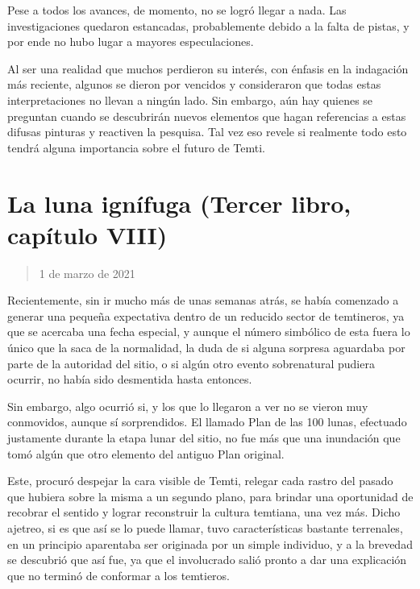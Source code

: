 \documentclass[
]{book}
\begin{document}
Pese a todos los avances, de momento, no se logró llegar a nada. Las investigaciones quedaron estancadas, probablemente debido a la falta de pistas, y por ende no hubo lugar a mayores especulaciones.

Al ser una realidad que muchos perdieron su interés, con énfasis en la indagación más reciente, algunos se dieron por vencidos y consideraron que todas estas interpretaciones no llevan a ningún lado. Sin embargo, aún hay quienes se preguntan cuando se descubrirán nuevos elementos que hagan referencias a estas difusas pinturas y reactiven la pesquisa. Tal vez eso revele si realmente todo esto tendrá alguna importancia sobre el futuro de Temti.

\hypertarget{la-luna-ignuxedfuga-tercer-libro-capuxedtulo-viii}{%
\section{La luna ignífuga (Tercer libro, capítulo VIII)}\label{la-luna-ignuxedfuga-tercer-libro-capuxedtulo-viii}}

\begin{quote}
1 de marzo de 2021
\end{quote}

Recientemente, sin ir mucho más de unas semanas atrás, se había comenzado a generar una pequeña expectativa dentro de un reducido sector de temtineros, ya que se acercaba una fecha especial, y aunque el número simbólico de esta fuera lo único que la saca de la normalidad, la duda de si alguna sorpresa aguardaba por parte de la autoridad del sitio, o si algún otro evento sobrenatural pudiera ocurrir, no había sido desmentida hasta entonces.

Sin embargo, algo ocurrió si, y los que lo llegaron a ver no se vieron muy conmovidos, aunque sí sorprendidos. El llamado Plan de las 100 lunas, efectuado justamente durante la etapa lunar del sitio, no fue más que una inundación que tomó algún que otro elemento del antiguo Plan original.

Este, procuró despejar la cara visible de Temti, relegar cada rastro del pasado que hubiera sobre la misma a un segundo plano, para brindar una oportunidad de recobrar el sentido y lograr reconstruir la cultura temtiana, una vez más. Dicho ajetreo, si es que así se lo puede llamar, tuvo características bastante terrenales, en un principio aparentaba ser originada por un simple individuo, y a la brevedad se descubrió que así fue, ya que el involucrado salió pronto a dar una explicación que no terminó de conformar a los temtieros.
\end{document}
